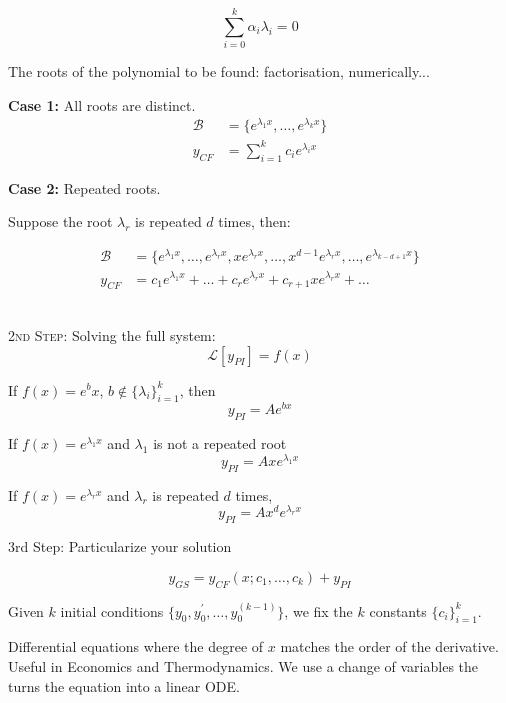 \documentclass[10pt]{scrartcl}
\begin{document}
\[\sum_{i=0}^k \alpha_i \lambda_i = 0\]

The roots of the polynomial to be found: factorisation, numerically...

\textbf{Case 1:} All roots are distinct. 
\[
\begin{aligned}
  \mathcal{B} &= \{e^{\lambda_1x},\dots,e^{\lambda_kx}\}\\
  y_{CF} &= \sum_{i=1}^k c_ie^{\lambda_ix}
\end{aligned}
\]

\textbf{Case 2:} Repeated roots. 

Suppose the root $\lambda_r$ is repeated $d$ times, then: 

\[
\begin{aligned}
  \mathcal{B} &= \{e^{\lambda_1x},\dots,e^{\lambda_rx},xe^{\lambda_rx},\dots,x^{d-1}e^{\lambda_rx},\dots,e^{\lambda_{k-d+1}x}\}\\[.2cm]
  y_{CF} &= c_1e^{\lambda_1x} + \dots + c_re^{\lambda_rx} + c_{r+1}xe^{\lambda_rx} + \dots 
\end{aligned}
\]~

\textsc{2nd Step:} Solving the full system:
\[\mathcal{L}[y_{PI}] = f(x)\]

If $f(x) = e^bx$, $b \not\in \{\lambda_i\}_{i=1}^k$, then
\[y_{PI} = Ae^{bx}\]

If $f(x) = e^{\lambda_1x}$ and $\lambda_1$ is not a repeated root
\[y_{PI} = Axe^{\lambda_1x}\]

If $f(x) = e^{\lambda_rx}$ and $\lambda_r$ is repeated $d$ times, 
\[y_{PI} = Ax^de^{\lambda_rx} \]

3rd Step: Particularize your solution

\[y_{GS} = y_{CF}(x;c_1,\dots,c_k) + y_{PI}\]

Given $k$ initial conditions $\{y_0,y_0^{'},\dots,y_0^{(k-1)}\}$, we fix the $k$ constants $\{c_i\}_{i=1}^k$. 





Differential equations where the degree of $x$ matches the order of the derivative. Useful in Economics and Thermodynamics. We use a change of variables the turns the equation into a linear ODE.\\
\end{document}
